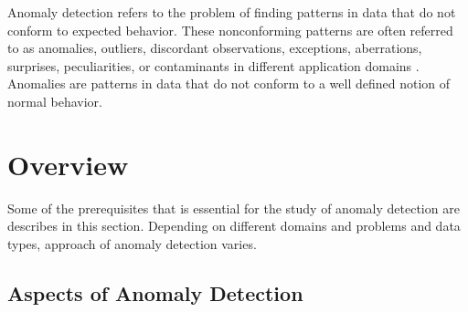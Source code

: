 Anomaly detection refers to the problem of finding patterns in data that do not conform
to expected behavior. These nonconforming patterns are often referred to as anomalies,
outliers, discordant observations, exceptions, aberrations, surprises, peculiarities, or contaminants in different application domains \cite{a}. Anomalies are patterns in data that do not conform to a well defined notion of normal
behavior.

\section{Overview}

Some of the prerequisites that is essential for the study of anomaly detection are describes in this section. Depending on different domains and problems and data types, approach of anomaly detection varies. 
\subsection{Aspects of Anomaly Detection}

